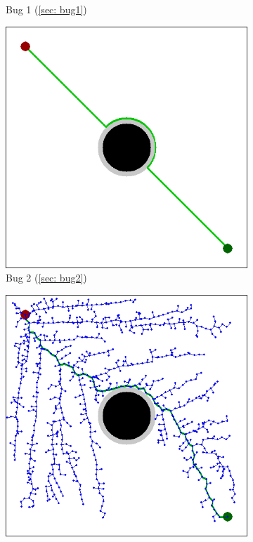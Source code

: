\begin{figure}[h]
\begin{subfigure}[b]{0.2\linewidth}
     \caption{Bug 1 (\ref{sec: bug1}) \newline}
  \end{subfigure}
  \newline
  \begin{subfigure}[b]{0.2\linewidth}
    \includegraphics[width=\linewidth]{images/screenshot_48.png}
     \caption{Bug 2 (\ref{sec: bug2}) \newline}
  \end{subfigure}
  \hfill
  \begin{subfigure}[b]{0.2\linewidth}
    \includegraphics[width=\linewidth]{images/screenshot_49.png}

\end{subfigure}
\end{figure}
